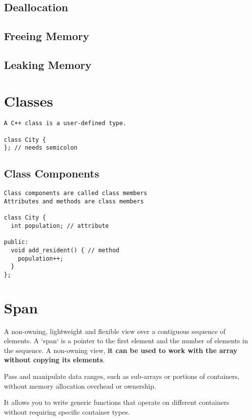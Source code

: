 \subsection{Deallocation}

\subsection{Freeing Memory}
\subsection{Leaking Memory}

\section{Classes}

\begin{verbatim}
A C++ class is a user-defined type.

class City {
}; // needs semicolon
\end{verbatim}

\subsection{Class Components}

\begin{verbatim}
Class components are called class members
Attributes and methods are class members

class City {
  int population; // attribute
 
public:
  void add_resident() { // method
    population++;
  }
};
\end{verbatim}


\section{Span}

A non-owning, lightweight and flexible view over a contiguous sequence of elements.
A `span` is a pointer to the first element and the number of elements in the sequence.
A non-owning view, \textbf{it can be used to work with the array without copying its elements}.

Pass and manipulate data ranges, such as sub-arrays or portions of containers,
without memory allocation overhead or ownership.

It allows you to write generic functions that operate on different containers
without requiring specific container types.

